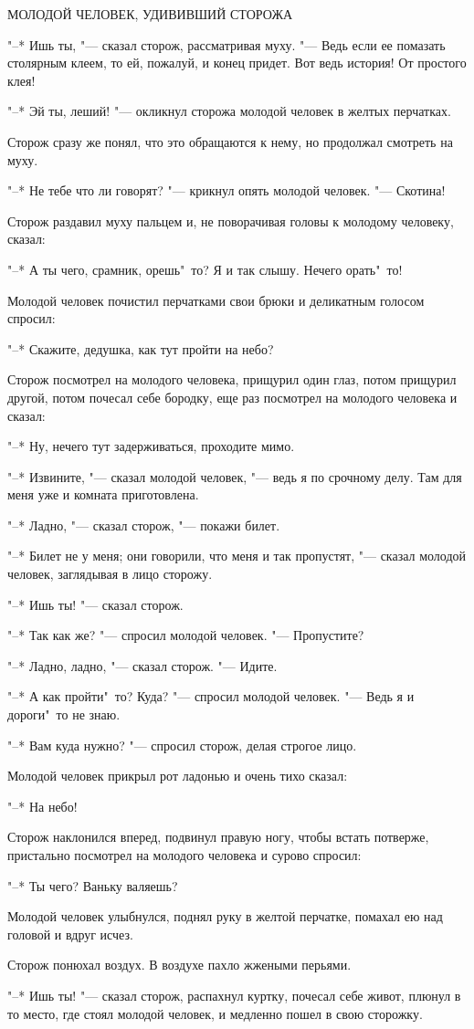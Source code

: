 МОЛОДОЙ  ЧЕЛОВЕК, УДИВИВШИЙ СТОРОЖА 

    "--* Ишь ты, "--- сказал сторож,  рассматривая 
муху. "--- Ведь если ее помазать столярным клеем, 
то ей, пожалуй, и конец придет. Вот ведь
история! От простого клея! 

    "--* Эй ты, леший! "--- окликнул сторожа молодой 
человек в желтых перчатках.

    Сторож сразу же понял, что это обращаются 
к нему, но продолжал смотреть на
муху. 

    "--* Не  тебе что  ли  говорят?  "---  крикнул
опять молодой человек. "--- Скотина! 

    Сторож раздавил муху пальцем и, не поворачивая 
головы к молодому человеку, сказал:

    "--* А ты чего, срамник, орешь"~то?  Я и так
слышу. Нечего орать"~то! 

    Молодой человек почистил перчатками свои
брюки и деликатным голосом спросил:

    "--* Скажите,  дедушка,  как  тут пройти на
небо? 

    Сторож  посмотрел  на молодого человека,
прищурил один глаз,  потом  прищурил другой,
потом почесал  себе бородку, еще раз посмотрел 
на молодого человека и сказал: 

    "--* Ну, нечего тут задерживаться, проходите мимо. 

    "--* Извините, "---  сказал молодой человек, "---
ведь я по срочному делу. Там для меня  уже и
комната приготовлена. 

    "--* Ладно, "--- сказал сторож, "--- покажи билет. 

    "--* Билет не у меня; они говорили, что меня 
и так пропустят, "--- сказал  молодой  человек, 
заглядывая в лицо сторожу. 

    "--* Ишь ты! "--- сказал сторож. 

    "--* Так как же? "--- спросил молодой человек.
"--- Пропустите? 

    "--* Ладно, ладно, "--- сказал сторож. "---  Идите. 

    "--* А как пройти"~то? Куда? "--- спросил молодой 
человек. "--- Ведь я и дороги"~то не знаю. 

    "--* Вам куда нужно? "--- спросил сторож, делая строгое лицо. 

    Молодой  человек  прикрыл  рот ладонью и
очень тихо сказал: 

    "--* На небо! 

    Сторож наклонился вперед, подвинул  правую 
ногу, чтобы  встать потверже, пристально
посмотрел  на  молодого  человека  и  сурово
спросил: 

    "--* Ты чего? Ваньку валяешь? 

    Молодой человек улыбнулся, поднял руку в
желтой  перчатке,  помахал  ею над головой и
вдруг исчез. 

    Сторож понюхал воздух.  В  воздухе пахло
жжеными перьями.

    "--* Ишь  ты!  "---  сказал  сторож, распахнул
куртку, почесал себе живот, плюнул в то место,  
где стоял молодой  человек,  и медленно
пошел в свою сторожку.